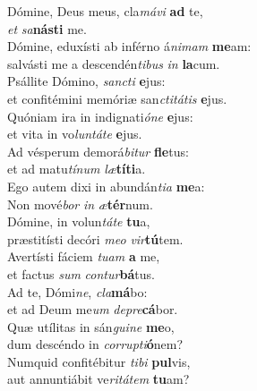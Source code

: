 \evenverse Dómine, Deus meus, cla\textit{má}\textit{vi} \textbf{ad} te,~\*\\
\evenverse \textit{et} \textit{sa}\textbf{ná}\textbf{sti} me.\\
\oddverse Dómine, eduxísti ab inférno á\textit{ni}\textit{mam} \textbf{me}am:~\*\\
\oddverse salvásti me a descendén\textit{ti}\textit{bus} \textit{in} \textbf{la}cum.\\
\evenverse Psállite Dómino, \textit{san}\textit{cti} \textbf{e}jus:~\*\\
\evenverse et confitémini memóriæ san\textit{cti}\textit{tá}\textit{tis} \textbf{e}jus.\\
\oddverse Quóniam ira in indignati\textit{ó}\textit{ne} \textbf{e}jus:~\*\\
\oddverse et vita in vo\textit{lun}\textit{tá}\textit{te} \textbf{e}jus.\\
\evenverse Ad vésperum demorá\textit{bi}\textit{tur} \textbf{fle}tus:~\*\\
\evenverse et ad matu\textit{tí}\textit{num} \textit{læ}\textbf{tí}\textbf{ti}a.\\
\oddverse Ego autem dixi in abundán\textit{ti}\textit{a} \textbf{me}a:~\*\\
\oddverse Non mové\textit{bor} \textit{in} \textit{æ}\textbf{tér}num.\\
\evenverse Dómine, in volun\textit{tá}\textit{te} \textbf{tu}a,~\*\\
\evenverse præstitísti decóri \textit{me}\textit{o} \textit{vir}\textbf{tú}tem.\\
\oddverse Avertísti fáciem \textit{tu}\textit{am} \textbf{a} me,~\*\\
\oddverse et factus \textit{sum} \textit{con}\textit{tur}\textbf{bá}tus.\\
\evenverse Ad te, Dómi\textit{ne}, \textit{cla}\textbf{má}bo:~\*\\
\evenverse et ad Deum me\textit{um} \textit{de}\textit{pre}\textbf{cá}bor.\\
\oddverse Quæ utílitas in sán\textit{gui}\textit{ne} \textbf{me}o,~\*\\
\oddverse dum descéndo in \textit{cor}\textit{rup}\textit{ti}\textbf{ó}nem?\\
\evenverse Numquid confitébitur \textit{ti}\textit{bi} \textbf{pul}vis,~\*\\
\evenverse aut annuntiábit ve\textit{ri}\textit{tá}\textit{tem} \textbf{tu}am?\\
